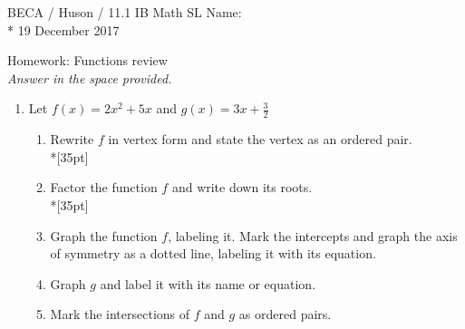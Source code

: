 \documentclass[]{book}
\begin{document}
\noindent BECA / Huson / 11.1 IB Math SL \hspace{2in} Name:\\*
19 December 2017
\begin{center}
{\Large Homework: Functions review}\\
\textit{Answer in the space provided.}
\end{center}



\begin{enumerate}

\item Let $f(x) = 2x^2+5x$ and $g(x)=3x+\frac{3}{2}$
\begin{enumerate}
    \item Rewrite $f$ in vertex form and state the vertex as an ordered pair.\\*[35pt]
    \item Factor the function $f$ and write down its roots.\\*[35pt]
    \item Graph the function $f$, labeling it. Mark the intercepts and graph the axis of symmetry as a dotted line, labeling it with its equation.
    \item Graph $g$ and label it with its name or equation.
    \item Mark the intersections of $f$ and $g$ as ordered pairs. 

\end{enumerate}


\begin{figure}[!htbp]
\begin{center}
\end{center}
\end{figure}
\end{enumerate}
\end{document}
